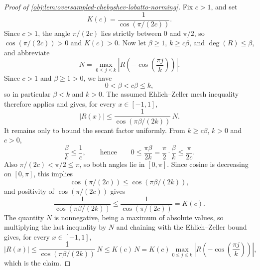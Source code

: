\begin{proof}[Proof of \cref{obj:lem:oversampled-chebyshev-lobatto-norming}]
Fix \(c>1\), and set
\[
K(c)=\frac{1}{\cos(\pi/(2c))}.
\]
Since \(c>1\), the angle \(\pi/(2c)\) lies strictly between \(0\) and \(\pi/2\), so \(\cos(\pi/(2c))>0\) and \(K(c)>0\). %
Now let \(\beta\ge1\), \(k\ge c\beta\), and \(\deg(R)\le\beta\), and abbreviate
\[
N=\max_{0\le j\le k}\left|R\!\left(-\cos\!\left(\frac{\pi j}{k}\right)\right)\right| .
\]
Since \(c>1\) and \(\beta\ge 1>0\), we have
\[
0<\beta<c\beta\le k ,
\]
so in particular \(\beta<k\) and \(k>0\). The assumed Ehlich--Zeller mesh inequality therefore applies and gives, for every \(x\in[-1,1]\),
\[
|R(x)|
\le
\frac{1}{\cos(\pi\beta/(2k))}\,N .
\] %
It remains only to bound the secant factor uniformly. From \(k\ge c\beta\), \(k>0\) and \(c>0\),
\[
\frac{\beta}{k}\le \frac1c,
\qquad\text{hence}\qquad
0\le \frac{\pi\beta}{2k}=\frac{\pi}{2}\cdot\frac{\beta}{k}\le \frac{\pi}{2c}.
\]
Also \(\pi/(2c)<\pi/2\le\pi\), so both angles lie in \([0,\pi]\). Since cosine is decreasing on \([0,\pi]\), this implies
\[
\cos(\pi/(2c))\le \cos(\pi\beta/(2k)),
\]
and positivity of \(\cos(\pi/(2c))\) gives
\[
\frac{1}{\cos(\pi\beta/(2k))}
\le
\frac{1}{\cos(\pi/(2c))}=K(c).
\] %
The quantity \(N\) is nonnegative, being a maximum of absolute values, so multiplying the last inequality by \(N\) and chaining with the Ehlich--Zeller bound gives, for every \(x\in[-1,1]\),
\[
|R(x)|
\le
\frac{1}{\cos(\pi\beta/(2k))}\,N
\le
K(c)\,N
=
K(c)\max_{0\le j\le k}\left|R\!\left(-\cos\!\left(\frac{\pi j}{k}\right)\right)\right| ,
\]
which is the claim. %
\end{proof}
